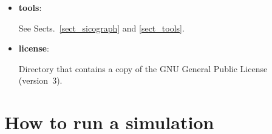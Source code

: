 \documentclass[12pt,a4paper]{article}
\begin{document}
\begin{itemize}
\begin{itemize}

\item
Subdirectory \textbf{quick\_start}:\\
\LaTeX{} source for this manual (PDF must be built with make).

\item
Subdirectory \textbf{doxygen}: documentation to be created by Doxygen\\
(optional, see doxygen-config/README.txt).

\begin{itemize}

\item html/index.html $\longrightarrow$ Source code browser.

\item latex/refman.pdf $\longrightarrow$ Reference manual.

\end{itemize}

\end{itemize}

\item \textbf{tools}:

See Sects.~\ref{sect_sicograph} and \ref{sect_tools}.

\item \textbf{license}:

Directory that contains a copy of the GNU General Public License (version~3).

\end{itemize}


\section{How to run a simulation}
\end{document}
